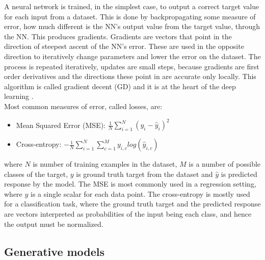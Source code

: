 A neural network is trained, in the simplest case, to output a correct target value for each input from a dataset. This is done by backpropagating some measure of error, how much different is the NN's output value from the target value, through the NN. This produces gradients. Gradients are vectors that point in the direction of steepest ascent of the NN's error. These are used in the opposite direction to iteratively change parameters and lower the error on the dataset. The process is repeated iteratively, updates are small steps, because gradients are first order derivatives and the directions these point in are accurate only locally. This algorithm is called gradient decent (GD) and it is at the heart of the deep learning \cite{Book.DeepLearning}. \\
Most common measures of error, called losses, are:
\begin{itemize}
\item Mean Squared Error (MSE): $\frac{1}{N}\sum^N_{i=1}(y_i - \hat y_i)^2$
\item Cross-entropy: $-\frac{1}{N}\sum^N_{i=1}\sum^M_{c=1}y_{i,c}log(\hat y_{i,c})$
\end{itemize}
where $N$ is number of training examples in the dataset, $M$ is a number of possible classes of the target, $y$ is ground truth target from the dataset and $\hat y$ is predicted response by the model. The MSE is most commonly used in a regression setting, where $y$ is a single scalar for each data point. The cross-entropy is mostly used for a classification task, where the ground truth target and the predicted response are vectors interpreted as probabilities of the input being each class, and hence the output must be normalized.

\subsection{Generative models} \label{Sec.ModelLearning}

